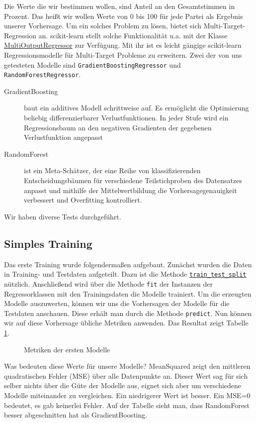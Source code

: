 \documentclass[a4paper,10pt]{scrartcl}
\begin{document}
Die Werte die wir bestimmen wollen, sind Anteil an den Gesamtstimmen in Prozent. Das heißt wir wollen Werte von 0 bis 100 für jede Partei als Ergebnis unserer Vorhersage. Um ein solches Problem zu lösen, bietet sich Multi-Target-Regression an. scikit-learn stellt solche Funktionalität u.a. mit der Klasse \href{https://scikit-learn.org/stable/modules/generated/sklearn.multioutput.MultiOutputRegressor.html}{MultiOutputRegressor} zur Verfügung. Mit ihr ist es leicht gängige scikit-learn Regressionsmodelle für Multi-Target Probleme zu erweitern. Zwei der von uns getesteten Modelle sind \lstinline|GradientBoostingRegressor| und \lstinline|RandomForestRegressor|.
\begin{description}
	\item[GradientBoosting] baut ein additives Modell schrittweise auf. Es ermöglicht die Optimierung beliebig differenzierbarer Verlustfunktionen. In jeder Stufe wird ein Regressionsbaum an den negativen Gradienten der gegebenen Verlustfunktion angepasst
	\item[RandomForest] ist ein Meta-Schätzer, der eine Reihe von klassifizierenden Entscheidungsbäumen für verschiedene Teilstichproben des Datensatzes anpasst und mithilfe der Mittelwertbildung die Vorhersagegenauigkeit verbessert und Overfitting kontrolliert.	 
\end{description}
 Wir haben diverse Tests durchgeführt.
 \subsection{Simples Training}
 Das erste Training wurde folgendermaßen aufgebaut. Zunächst wurden die Daten in Training- und Testdaten aufgeteilt. Dazu ist die Methode \href{https://scikit-learn.org/stable/modules/generated/sklearn.model_selection.train_test_split.html}{\lstinline|train_test_split|} nützlich. Anschließend wird über die Methode \lstinline|fit| der Instanzen der Regressorklassen mit den Trainingsdaten die Modelle trainiert. Um die erzeugten Modelle auszuwerten, können wir uns die Vorhersagen der Modelle für die Testdaten anschauen. Diese erhält man durch die Methode \lstinline|predict|. Nun können wir auf diese Vorhersage übliche Metriken anwenden. Das Resultat zeigt Tabelle \ref{fig:firstresult}.\begin{figure}
 	\centering
 	\caption{Metriken der ersten Modelle}
 	\label{fig:firstresult}
 \end{figure} Was bedeuten diese Werte für unsere Modelle? MeanSquared zeigt den mittleren quadratischen Fehler (MSE) über alle Datenpunkte an. Dieser Wert sag für sich selber nichts über die Güte der Modelle aus, eignet sich aber um verschiedene Modelle miteinander zu vergleichen. Ein niedrigerer Wert ist besser. Ein MSE=0 bedeutet, es gab keinerlei Fehler. Auf der Tabelle sieht man, dass RandomForest besser abgeschnitten hat als GradientBoosting.
\end{document}
